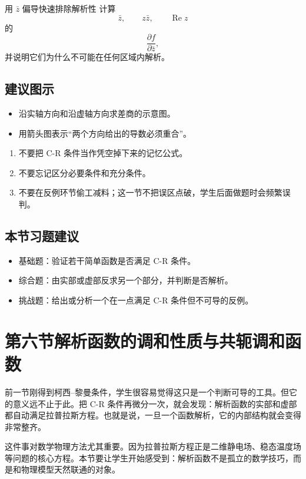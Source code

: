\begin{lizi}{用 $\bar z$ 偏导快速排除解析性}{}
计算
\[
    \bar z,\qquad z\bar z,\qquad \operatorname{Re}z
\]
的
\[
    \frac{\partial f}{\partial \bar z},
\]
并说明它们为什么不可能在任何区域内解析。
\end{lizi}

\subsection*{建议图示}
\begin{itemize}
    \item 沿实轴方向和沿虚轴方向求差商的示意图。
    \item 用箭头图表示``两个方向给出的导数必须重合''。
\end{itemize}

\begin{jinshi}[本节易错点]
\begin{enumerate}
    \item 不要把 C-R 条件当作凭空掉下来的记忆公式。
    \item 不要忘记区分必要条件和充分条件。
    \item 不要在反例环节偷工减料；这一节不把误区点破，学生后面做题时会频繁误判。
\end{enumerate}
\end{jinshi}

\subsection*{本节习题建议}
\begin{itemize}
    \item 基础题：验证若干简单函数是否满足 C-R 条件。
    \item 综合题：由实部或虚部反求另一个部分，并判断是否解析。
    \item 挑战题：给出或分析一个在一点满足 C-R 条件但不可导的反例。
\end{itemize}

\section{第六节\quad 解析函数的调和性质与共轭调和函数}

\begin{wulibj}[本节要解决的问题]
前一节刚得到柯西--黎曼条件，学生很容易觉得这只是一个判断可导的工具。但它的意义远不止于此。把 C-R 条件再微分一次，就会发现：解析函数的实部和虚部都自动满足拉普拉斯方程。也就是说，一旦一个函数解析，它的内部结构就会变得非常整齐。

这件事对数学物理方法尤其重要。因为拉普拉斯方程正是二维静电场、稳态温度场等问题的核心方程。本节要让学生开始感受到：解析函数不是孤立的数学技巧，而是和物理模型天然联通的对象。
\end{wulibj}

